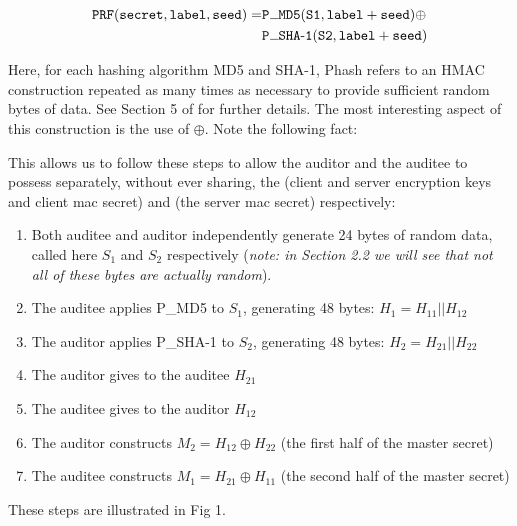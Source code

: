 \documentclass[10pt,a4paper]{article}
\begin{document}
\begin{eqnarray*}
\mathtt{PRF(secret, label, seed)} = & \mathtt{P\leavevmode \kern.06em\vbox{\hrule width.6em}MD5(S1, label + seed)} \oplus \\
& \mathtt{P\leavevmode \kern.06em\vbox{\hrule width.6em}SHA\textrm{-}1(S2, label + seed)}
\end{eqnarray*}

\noindent Here, for each hashing algorithm MD5 and SHA-1, P\textunderscore hash refers to an HMAC construction repeated as many times as necessary to provide sufficient random bytes of data. See Section 5 of \cite{TLS_spec} for further details.
\noindent The most interesting aspect of this construction is the use of $\oplus$. Note the following fact:


\noindent This allows us to follow these steps to allow the auditor and the auditee to possess separately, without ever sharing, the (client and server encryption keys and client mac secret) and (the server mac secret) respectively:

\begin{enumerate}
\item Both auditee and auditor independently generate 24 bytes of random data, called here $S_1$ and $S_2$ respectively (\textit{note: in Section 2.2 we will see that not all of these bytes are actually random}).
\item The auditee applies P\_MD5 to $S_1$, generating 48 bytes: $H_1 = H_{11}||H_{12}$
\item The auditor applies P\_SHA-1 to $S_2$, generating 48 bytes: $H_2 = H_{21}||H_{22}$
\item The auditor gives to the auditee $H_{21}$
\item The auditee gives to the auditor $H_{12}$
\item The auditor constructs $M_{2} = H_{12} \oplus H_{22}$ (the first half of the master secret)
\item The auditee constructs $M_{1} = H_{21} \oplus H_{11}$ (the second half of the master secret)
\setcounter{enumTemp}{\theenumi}
\end{enumerate}
These steps are illustrated in Fig 1.
\end{document}
